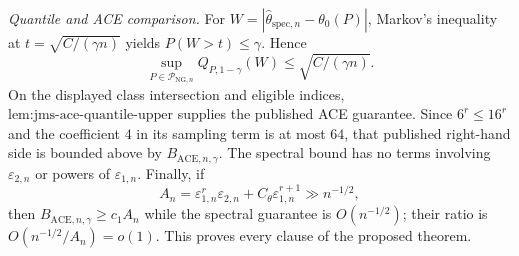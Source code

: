 \emph{Quantile and ACE comparison.}
For \(W=|\widehat\theta_{\mathrm{spec},n}-\theta_0(P)|\), Markov's inequality at \(t=\sqrt{C/(\gamma n)}\) yields \(P(W>t)\le\gamma\).  Hence
\[
 \sup_{P\in\mathcal P_{\mathrm{NG},n}}Q_{P,1-\gamma}(W)
 \le\sqrt{C/(\gamma n)}.
\]
On the displayed class intersection and eligible indices, \(\text{lem:jms-ace-quantile-upper}\) supplies the published ACE guarantee.  Since \(6^r\le16^r\) and the coefficient \(4\) in its sampling term is at most \(64\), that published right-hand side is bounded above by \(B_{\mathrm{ACE},n,\gamma}\).  The spectral bound has no terms involving \(\varepsilon_{2,n}\) or powers of \(\varepsilon_{1,n}\).  Finally, if
\[
 A_n=\varepsilon_{1,n}^r\varepsilon_{2,n}
 +C_{\theta}\varepsilon_{1,n}^{r+1}\gg n^{-1/2},
\]
then \(B_{\mathrm{ACE},n,\gamma}\ge c_1A_n\) while the spectral guarantee is \(O(n^{-1/2})\); their ratio is \(O(n^{-1/2}/A_n)=o(1)\).  This proves every clause of the proposed theorem.